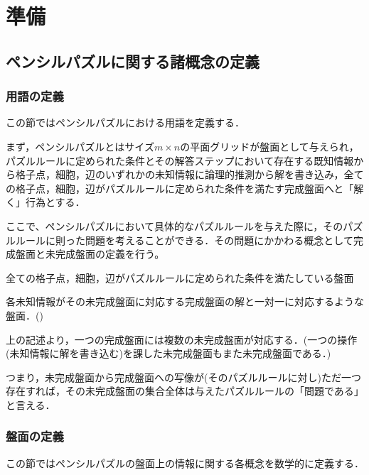 \chapter{準備}
\section{ペンシルパズルに関する諸概念の定義}
\subsection{用語の定義}
この節ではペンシルパズルにおける用語を定義する．

まず，ペンシルパズルとはサイズ$m\times n$の平面グリッドが盤面として与えられ，パズルルールに定められた条件とその解答ステップにおいて存在する既知情報から格子点，細胞，辺のいずれかの未知情報に論理的推測から解を書き込み，全ての格子点，細胞，辺がパズルルールに定められた条件を満たす完成盤面へと「解く」行為とする．

ここで、ペンシルパズルにおいて具体的なパズルルールを与えた際に，そのパズルルールに則った問題を考えることができる．その問題にかかわる概念として完成盤面と未完成盤面の定義を行う。

\begin{definition}\label{FinishedBoard}\textup{}

  全ての格子点，細胞，辺がパズルルールに定められた条件を満たしている盤面
\end{definition}

\begin{definition}\label{UnfinishedBoard}\textup{}

  各未知情報がその未完成盤面に対応する完成盤面の解と一対一に対応するような盤面．()
\end{definition}

上の記述より，一つの完成盤面には複数の未完成盤面が対応する．(一つの操作(未知情報に解を書き込む)を課した未完成盤面もまた未完成盤面である．)

つまり，未完成盤面から完成盤面への写像が(そのパズルルールに対し)ただ一つ存在すれば，その未完成盤面の集合全体は与えたパズルルールの「問題である」と言える．

\subsection{盤面の定義}
この節ではペンシルパズルの盤面上の情報に関する各概念を数学的に定義する．


